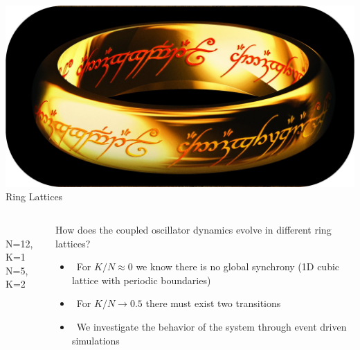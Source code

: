 \documentclass[serif,mathserif]{beamer}
\begin{document}
\begin{frame}{\includegraphics[height=0.06\textheight]{ring-of-power.eps}\hspace{0.25cm} Ring Lattices}
    \begin{columns}
        \begin{column}{0.4\textwidth}
            \\
            N=12, K=1
            \\
            N=5, K=2
        \end{column}
        \begin{column}{0.6\textwidth}
            How does the coupled oscillator dynamics evolve in different ring lattices?\\
            \vspace{0.25cm}
            \begin{itemize}
                \vspace{0.25cm}
                \item \ \pause For $K/N \approx 0$ we know there is no global synchrony (1D cubic lattice with periodic boundaries)
                \vspace{0.25cm}
                \item \ \pause For $K/N\rightarrow 0.5$ there must exist two transitions
                \vspace{0.25cm}
                \item \ \pause We investigate the behavior of the system through event driven simulations
            \end{itemize}
        \end{column}
    \end{columns}
\end{frame}
\end{document}
